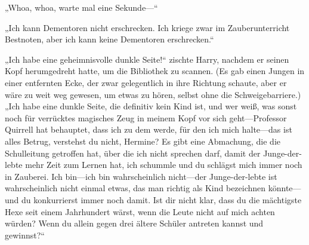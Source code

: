 „Whoa, whoa, warte mal eine Sekunde—“

„Ich kann Dementoren nicht erschrecken. Ich kriege zwar im Zauberunterricht Bestnoten, aber ich kann keine Dementoren erschrecken.“

„Ich habe eine geheimnisvolle dunkle Seite!“ zischte Harry, nachdem er seinen Kopf herumgedreht hatte, um die Bibliothek zu scannen. (Es gab einen Jungen in einer entfernten Ecke, der zwar gelegentlich in ihre Richtung schaute, aber er wäre zu weit weg gewesen, um etwas zu hören, selbst ohne die Schweigebarriere.) „Ich habe eine dunkle Seite, die definitiv kein Kind ist, und wer weiß, was sonst noch für verrücktes magisches Zeug in meinem Kopf vor sich geht—Professor Quirrell hat behauptet, dass ich zu dem werde, für den ich mich halte—das ist alles Betrug, verstehst du nicht, Hermine? Es gibt eine Abmachung, die die Schulleitung getroffen hat, über die ich nicht sprechen darf, damit der Junge-der-lebte mehr Zeit zum Lernen hat, ich schummle und du schlägst mich immer noch in Zauberei. Ich bin—ich bin wahrscheinlich nicht—der Junge-der-lebte ist wahrscheinlich nicht einmal etwas, das man richtig als Kind bezeichnen könnte—und du konkurrierst immer noch damit. Ist dir nicht klar, dass du die mächtigste Hexe seit einem Jahrhundert wärst, wenn die Leute nicht auf mich achten würden? Wenn du allein gegen drei ältere Schüler antreten kannst und gewinnst?“

